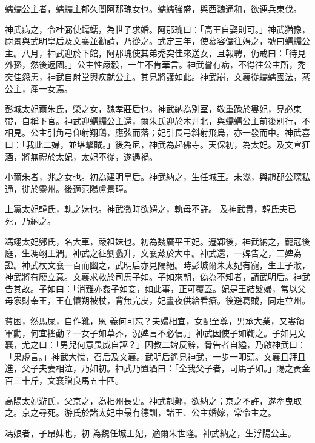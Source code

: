 \begin{pinyinscope}
 蠕蠕公主者，蠕蠕主郁久閭阿那瑰女也。蠕蠕強盛，與西魏通和，欲連兵東伐。



 神武病之，令杜弼使蠕蠕，為世子求婚。阿那瑰曰：「高王自娶則可。」神武猶豫，尉景與武明皇后及文襄並勸請，乃從之。武定三年，使慕容儼往娉之，號曰蠕蠕公主。八月，神武迎於下館，阿那瑰使其弟禿突佳來送女，且報聘，仍戒曰：「待見外孫，然後返國。」公主性嚴毅，一生不肯華言。神武嘗有病，不得往公主所，禿突佳怨恚，神武自射堂輿疾就公主。其見將護如此。神武崩，文襄從蠕蠕國法，蒸公主，產一女焉。



 彭城太妃爾朱氏，榮之女，魏孝莊后也。神武納為別室，敬重踰於婁妃，見必束帶，自稱下官。神武迎蠕蠕公主還，爾朱氏迎於木井北，與蠕蠕公主前後別行，不相見。公主引角弓仰射翔鴟，應弦而落；妃引長弓斜射飛烏，亦一發而中。神武喜曰：「我此二婦，並堪擊賊。」後為尼，神武為起佛寺。天保初，為太妃。及文宣狂酒，將無禮於太妃，太妃不從，遂遇禍。



 小爾朱者，兆之女也。初為建明皇后。神武納之，生任城王。未幾，與趙郡公琛私通，徙於靈州。後適范陽盧景璋。



 上黨太妃韓氏，軌之妹也。神武微時欲娉之，軌母不許。
 及神武貴，韓氏夫已死，乃納之。



 馮翊太妃鄭氏，名大車，嚴祖妹也。初為魏廣平王妃。遷鄴後，神武納之，寵冠後庭，生馮翊王潤。神武之征劉蠡升，文襄蒸於大車。神武還，一婢告之，二婢為證。神武杖文襄一百而幽之，武明后亦見隔絕。時彭城爾朱太妃有寵，生王子浟，神武將有廢立意。文襄求救於司馬子如。子如來朝，偽為不知者，請武明后。神武告其故。子如曰：「消難亦姦子如妾，如此事，正可覆蓋。妃是王結髮婦，常以父母家財奉王，王在懷朔被杖，背無完皮，妃晝夜供給看瘡。後避葛賊，同走並州。



 貧困，然馬屎，自作靴，恩
 義何可忘？夫婦相宜，女配至尊，男承大業，又婁領軍勳，何宜搖動？一女子如草芥，況婢言不必信。」神武因使子如鞫之。子如見文襄，尤之曰：「男兒何意畏威自誣？」因教二婢反辭，脅告者自縊，乃啟神武曰：「果虛言。」神武大悅，召后及文襄。武明后遙見神武，一步一叩頭。文襄且拜且進，父子夫妻相泣，乃如初。神武乃置酒曰：「全我父子者，司馬子如。」賜之黃金百三十斤，文襄贈良馬五十匹。



 高陽太妃游氏，父京之，為相州長史。神武剋鄴，欲納之；京之不許，遂牽曳取之。京之尋死。游氏於諸太妃中最有德訓，諸王、公主婚嫁，常令主之。



 馮娘者，子昂妹也，初
 為魏任城王妃，適爾朱世隆。神武納之，生浮陽公主。




\end{pinyinscope}
